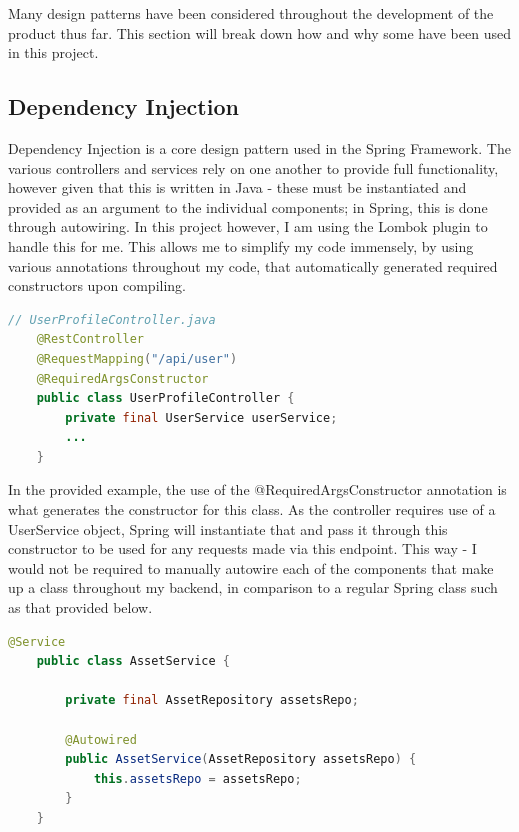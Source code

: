 \documentclass[]{final_report}
\begin{document}

Many design patterns have been considered throughout the development of the product thus far. This section will break down how and why some have been used in this project.
\subsection{Dependency Injection}
Dependency Injection is a core design pattern used in the Spring Framework. The various controllers and services rely on one another to provide full functionality, however given that this is written in Java - these must be instantiated and provided as an argument to the individual components; in Spring, this is done through autowiring. In this project however, I am using the Lombok plugin to handle this for me. This allows me to simplify my code immensely, by using various annotations throughout my code, that automatically generated required constructors upon compiling.

\begin{lstlisting}[language=java, caption={An example of a Spring Boot Component with the Lombok Plugin.}]
	// UserProfileController.java
	@RestController
	@RequestMapping("/api/user")
	@RequiredArgsConstructor
	public class UserProfileController {
		private final UserService userService;
		...
	}
\end{lstlisting}

In the provided example, the use of the @RequiredArgsConstructor annotation is what generates the constructor for this class. As the controller requires use of a UserService object, Spring will instantiate that and pass it through this constructor to be used for any requests made via this endpoint. This way - I would not be required to manually autowire each of the components that make up a class throughout my backend, in comparison to a regular Spring class such as that provided below.

\begin{lstlisting}[language=Java, caption={An example of a Spring Boot Component without the Lombok Plugin. Use of the plugin prevents the need for boilerplate code such as this.}]
	@Service
	public class AssetService {
		
		private final AssetRepository assetsRepo;
		
		@Autowired
		public AssetService(AssetRepository assetsRepo) {
			this.assetsRepo = assetsRepo;
		}
	}
\end{lstlisting}
\end{document}
